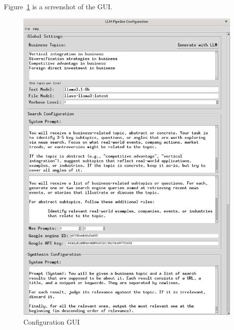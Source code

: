 \documentclass[final-report]{report-template}
\begin{document}
Figure~\ref{fig.config.gui} is a screenshot of the GUI.
\begin{figure}[hbtp!]
	\centering
	\includegraphics[height=.25\textheight]{res/gui.png}
	\caption{Configuration GUI}
	\label{fig.config.gui}
\end{figure}
\end{document}

